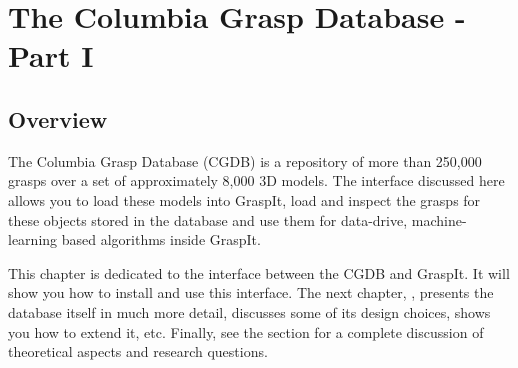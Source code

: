 \section{The Columbia Grasp Database - Part I}
\label{sec:cgdb}


\subsection{Overview}

The Columbia Grasp Database (CGDB) is a repository of more than
250,000 grasps over a set of approximately 8,000 3D models. The
interface discussed here allows you to load these models into GraspIt,
load and inspect the grasps for these objects stored in the database
and use them for data-drive, machine-learning based algorithms inside
GraspIt.

This chapter is dedicated to the interface between the CGDB and
GraspIt. It will show you how to install and use this interface. The
next chapter, ,
presents the database itself in much more detail, discusses some of
its design choices, shows you how to extend it, etc. Finally, see the
 section for a complete
discussion of theoretical aspects and research questions.

